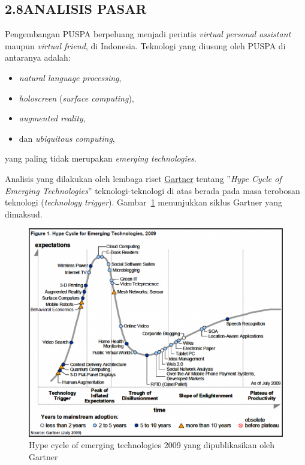 \subsection*{\textsf{\normalsize 2.8\hspace{0.5cm}ANALISIS PASAR}}

Pengembangan PUSPA berpeluang menjadi perintis \textit{virtual personal assistant} maupun \textit{virtual friend}, di Indonesia. Teknologi yang diusung oleh PUSPA di antaranya adalah:
\begin{itemize}
	\item \textit{natural language processing},
	\item \textit{holoscreen} (\textit{surface computing}),
	\item \textit{augmented reality},
	\item dan \textit{ubiquitous computing},
\end{itemize}
yang paling tidak merupakan \textit{emerging technologies}.

Analisis yang dilakukan oleh lembaga riset \href{http://www.gartner.com}{Gartner} tentang ''\textit{Hype Cycle of Emerging Technologies}'' teknologi-teknologi di atas berada pada masa terobosan teknologi (\textit{technology trigger}). Gambar~\ref{fig:gartner} menunjukkan siklus Gartner yang dimaksud.

\begin{figure}
	\centering
		\includegraphics[scale=0.6]{gartner}
	\caption{Hype cycle of emerging technologies 2009 yang dipublikasikan oleh Gartner}
	\label{fig:gartner}
\end{figure}

